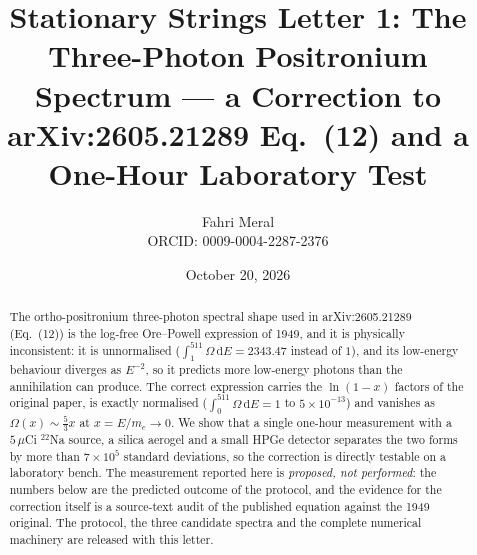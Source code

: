 \documentclass[11pt,a4paper]{article}
\title{\textbf{Stationary Strings Letter 1: The Three-Photon Positronium Spectrum --- a Correction to arXiv:2605.21289 Eq.~(12) and a One-Hour Laboratory Test}}
\author{Fahri Meral\\[0.2em]\small ORCID: 0009-0004-2287-2376}
\date{October 20, 2026}
\begin{document}
\maketitle

\begin{abstract}
The ortho-positronium three-photon spectral shape used in
arXiv:2605.21289 (Eq.~(12)) is the log-free Ore--Powell expression of
1949, and it is physically inconsistent: it is unnormalised
($\int_1^{511}\Omega\,\mathrm{d}E = 2343.47$ instead of $1$), and its
low-energy behaviour diverges as $E^{-2}$, so it predicts more
low-energy photons than the annihilation can produce. The correct
expression carries the $\ln(1-x)$ factors of the original paper,
is exactly normalised ($\int_0^{511}\Omega\,\mathrm{d}E = 1$ to
$5\times 10^{-13}$) and vanishes as $\Omega(x)\sim\tfrac{5}{3}x$ at
$x=E/m_e\to 0$. We show that a single one-hour measurement with a
$5\,\mu$Ci $^{22}$Na source, a silica aerogel and a small HPGe
detector separates the two forms by more than $7\times 10^{5}$
standard deviations, so the correction is directly testable on a
laboratory bench. The measurement reported here is \emph{proposed, not
performed}: the numbers below are the predicted outcome of the
protocol, and the evidence for the correction itself is a source-text
audit of the published equation against the 1949 original. The
protocol, the three candidate spectra and the complete numerical
machinery are released with this letter.
\end{abstract}
\end{document}
